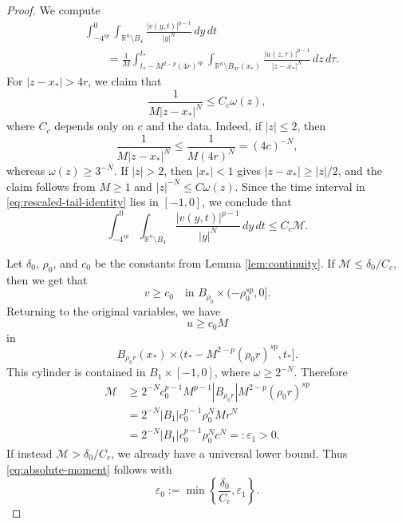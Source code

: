 \documentclass[10pt]{amsart}
\theoremstyle{plain}
\theoremstyle{definition}
\theoremstyle{remark}
\numberwithin{equation}{section}
\newcommand{\R}{\mathbb R}
\begin{document}
\begin{proof}
We compute
\begin{equation}\label{eq:rescaled-tail-identity}
\begin{split}
&\int_{-4^{sp}}^0
\int_{\R^n\setminus B_4}
\frac{|v(y,t)|^{p-1}}{|y|^N}\,dy\,dt
\\
&\qquad=
\frac1M
\int_{t_*-M^{2-p}(4r)^{sp}}^{t_*}
\int_{\R^n\setminus B_{4r}(x_*)}
\frac{|u(z,\tau)|^{p-1}}{|z-x_*|^N}\,dz\,d\tau.
\end{split}
\end{equation}
For $|z-x_*|>4r$, we claim that
\begin{equation}\label{eq:kernel-weight-comparison}
\frac1{M|z-x_*|^N}
\le
C_c\omega(z),
\end{equation}
where $C_c$ depends only on $c$ and the data. Indeed, if $|z|\le2$, then
\[
\frac1{M|z-x_*|^N}
\le
\frac1{M(4r)^N}
=
(4c)^{-N},
\]
whereas $\omega(z)\ge3^{-N}$. If $|z|>2$, then $|x_*|<1$ gives
$|z-x_*|\ge|z|/2$, and the claim follows from $M\ge1$ and
$|z|^{-N}\le C\omega(z)$. Since the time interval in
\eqref{eq:rescaled-tail-identity} lies in $[-1,0]$, we conclude that
\begin{equation}\label{eq:rescaled-tail-moment-bound}
\int_{-4^{sp}}^0
\int_{\R^n\setminus B_4}
\frac{|v(y,t)|^{p-1}}{|y|^N}\,dy\,dt
\le
C_c\mathcal M.
\end{equation}

Let $\delta_0$, $\rho_0$, and $c_0$ be the constants from Lemma
\ref{lem:continuity}. If $\mathcal M\le\delta_0/C_c$, then we get
that
\[
v\ge c_0
\quad\text{in }
B_{\rho_0}\times(-\rho_0^{sp},0].
\]
Returning to the original variables, we have
\begin{equation}\label{eq:physical-positive-cylinder}
u\ge c_0M
\end{equation}
in
\[
B_{\rho_0r}(x_*)
\times
\bigl(t_*-M^{2-p}(\rho_0r)^{sp},t_*\bigr].
\]
This cylinder is contained in $B_1\times[-1,0]$, where
$\omega\ge2^{-N}$. Therefore
\begin{align*}
\mathcal M
&\ge
2^{-N}c_0^{p-1}M^{p-1}
|B_{\rho_0r}|
M^{2-p}(\rho_0r)^{sp}
\\
&=
2^{-N}|B_1|c_0^{p-1}\rho_0^N
Mr^N
\\
&=
2^{-N}|B_1|c_0^{p-1}\rho_0^Nc^N
=:
\varepsilon_1>0.
\end{align*}
If instead $\mathcal M>\delta_0/C_c$, we already have a universal lower
bound. Thus \eqref{eq:absolute-moment} follows with
\[
\varepsilon_0
:=
\min\left\{\frac{\delta_0}{C_c},\varepsilon_1\right\}.
\]
\end{proof}
\end{document}
